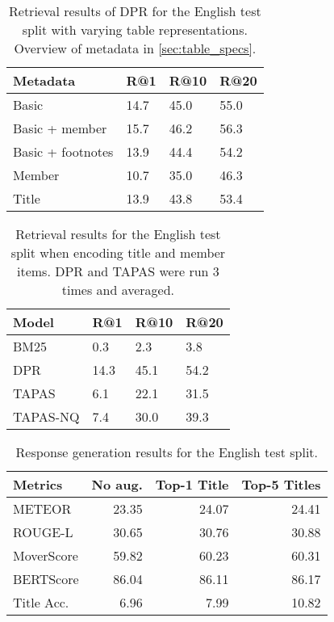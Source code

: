 \documentclass[11pt]{article}
\begin{document}
\begin{table}[t]
    \small
    \centering
\begin{tabular}{llll}
\toprule
    Metadata &     R@1 &    R@10 &    R@20 \\
\midrule
Basic & 14.7 &  45.0 &  55.0 \\
Basic + member & 15.7 &  46.2 &  56.3 \\
Basic + footnotes & 13.9 &  44.4 &  54.2 \\
Member &  10.7 &  35.0 &  46.3 \\
Title & 13.9 &  43.8 &  53.4 \\
\bottomrule
\end{tabular}
    \caption{Retrieval results of DPR for the English test split with varying table representations. Overview of metadata in \autoref{sec:table_specs}. \vspace{-2mm}}
    \label{tab:selected_retrieval_results_english}
\end{table}
\begin{table}[t]
    \small
    \centering
\begin{tabular}{llll}
\toprule
    Model &     R@1 &    R@10 &    R@20 \\
\midrule
BM25 & 0.3 & 2.3 & 3.8 \\
DPR & 14.3 & 45.1 & 54.2 \\
TAPAS &  6.1 &  22.1 & 31.5 \\
TAPAS-NQ & 7.4 & 30.0 & 39.3 \\
\bottomrule
\end{tabular}
    \caption{Retrieval results for the English test split when encoding title and member items. DPR and TAPAS were run 3 times and averaged. 
    \vspace{-2mm}}
    \label{tab:retrieval_results_varying_representations}
\end{table}

\begin{table}[t]
    \small
    \centering
\begin{tabular}{lrrr}
\toprule
Metrics &   No aug. &  Top-1 Title &  Top-5 Titles \\
\midrule
METEOR     &  23.35 &        24.07 &         24.41 \\
ROUGE-L    &  30.65 &        30.76 &         30.88 \\
MoverScore &  59.82 &        60.23 &         60.31 \\
BERTScore  &  86.04 &        86.11 &         86.17 \\
Title Acc. &   6.96 &         7.99 &         10.82 \\
\bottomrule
\end{tabular}
    \caption{Response generation results for the English test split.\vspace{-3mm}}
    \label{tab:selected_generation_results_english}
\end{table}
\end{document}
